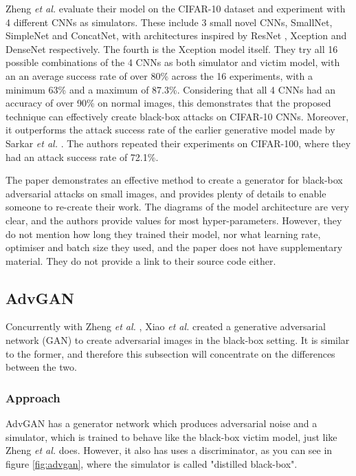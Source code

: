 Zheng \textit{et al.} \cite{zheng_black_box_GAN} evaluate their model on the CIFAR-10 dataset and experiment with 4 different CNNs as simulators. These include 3 small novel CNNs, SmallNet, SimpleNet and ConcatNet, with architectures inspired by ResNet \cite{resnet}, Xception \cite{xception} and DenseNet \cite{densenet} respectively. The fourth is the Xception model \cite{xception} itself. They try all 16 possible combinations of the 4 CNNs as both simulator and victim model, with an an average success rate of over 80\% across the 16 experiments, with a minimum 63\% and a maximum of 87.3\%. Considering that all 4 CNNs had an accuracy of over 90\% on normal images, this demonstrates that the proposed technique can effectively create black-box attacks on CIFAR-10 CNNs. Moreover, it outperforms the attack success rate of the earlier generative model made by Sarkar \textit{et al.} \cite{upset_angri}. The authors repeated their experiments on CIFAR-100, where they had an attack success rate of 72.1\%.

The paper demonstrates an effective method to create a generator for black-box adversarial attacks on small images, and provides plenty of details to enable someone to re-create their work. The diagrams of the model architecture are very clear, and the authors provide values for most hyper-parameters. However, they do not mention how long they trained their model, nor what learning rate, optimiser and batch size they used, and the paper does not have supplementary material. They do not provide a link to their source code either.

\subsection{AdvGAN}
    \label{subsec:AdvGAN}
    
Concurrently with Zheng \textit{et al.} \cite{zheng_black_box_GAN}, Xiao \textit{et al.} \cite{advGAN} created a generative adversarial network (GAN) to create adversarial images in the black-box setting. It is similar to the former, and therefore this subsection will concentrate on the differences between the two.

\subsubsection{Approach}

AdvGAN has a generator network which produces adversarial noise and a simulator, which is trained to behave like the black-box victim model, just like Zheng \textit{et al.} does. However, it also has uses a discriminator, as you can see in figure \ref{fig:advgan}, where the simulator is called "distilled black-box". 

